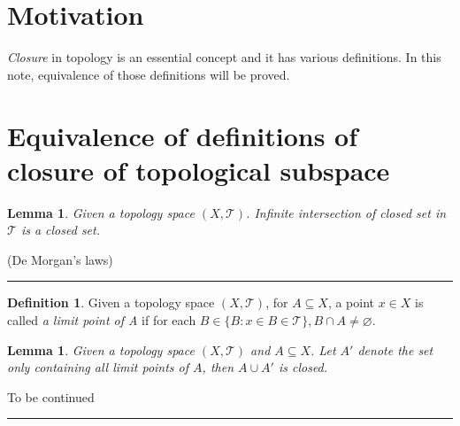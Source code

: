 \documentclass[12pt]{article}
\numberwithin{equation}{section}
\theoremstyle{plain} %
\newtheorem{lemma}[equation]{Lemma}
\theoremstyle{definition}
\newtheorem{definition}[equation]{Definition}
\theoremstyle{remark}
\newenvironment{proof}{{\bf Proof:}}{\hfill\rule{2mm}{2mm}}
\begin{document}

\section{Motivation}
\textit{Closure} in topology is an essential concept and it has various definitions. In this note, equivalence of those definitions will be proved.

\section{Equivalence of definitions of closure of topological subspace}

\begin{lemma}
Given a topology space $(X, \mathcal{T})$. Infinite intersection of closed set in $\mathcal{T}$ is a closed set. \label{lemma:intersection of closed set is closed set}
\end{lemma}

\begin{proof}
(De Morgan's laws)
\end{proof}

\begin{definition}
Given a topology space $(X, \mathcal{T})$, for $A \subseteq X$, a point $x \in X$ is called \textit{a limit point of A} if for each $B \in \{B: x \in B \in \mathcal{T} \}, B \cap A \neq \varnothing$. \label{definition:limit point}
\end{definition}

\begin{lemma}
Given a topology space $(X, \mathcal{T})$ and $A \subseteq X$. Let $A'$ denote the set only containing all limit points of $A$, then $A \cup A'$ is closed.  \label{lemma:limit point set is closed}
\end{lemma}

\begin{proof}
To be continued
\end{proof}
\end{document}
